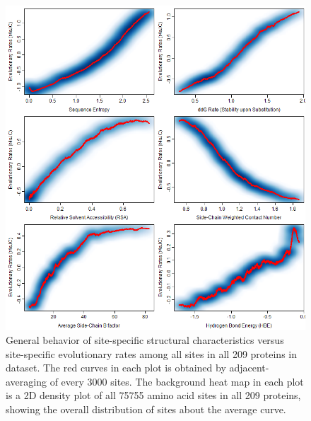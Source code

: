 \documentclass[11pt]{article}
\begin{document}
    \begin{figure}
        \begin{center}
        \includegraphics[width=5.5in]{adjacent_averaging_screen/only_nonvoro/zr4s_JC_nonvoro.png}
        \end{center}
        \caption{General behavior of site-specific structural characteristics versus site-specific evolutionary rates among all sites in all 209 proteins in dataset. The red curves in each plot is obtained by adjacent-averaging of every $3000$ sites. The background heat map in each plot is a 2D density plot of all 75755 amino acid sites in all 209 proteins, showing the overall distribution of sites about the average curve.}
        \label{fig:zr4s_JC_nonvoro}
    \end{figure}
\end{document}
